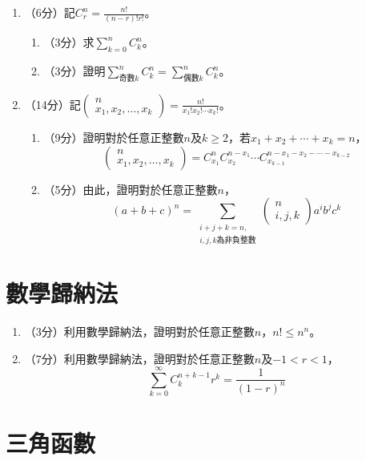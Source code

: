 \documentclass[12pt]{article}
\begin{document}
    \begin{enumerate}
        \item （6分）記$C_r^n=\frac{n!}{(n-r)!r!}$。\begin{enumerate}
            \item （3分）求$\sum_{k=0}^n C_k^n$。
            \item （3分）證明$\sum_{\textrm{奇數}k}^n C_k^n=\sum_{\textrm{偶數}k}^n C_k^n$。
        \end{enumerate}
        \item （14分）記$\begin{pmatrix}
            n\\x_1,x_2,\dots,x_k
        \end{pmatrix}=\frac{n!}{x_1!x_2!\cdots x_k!}$。\begin{enumerate}
            \item （9分）證明對於任意正整數$n$及$k\geq 2$，若$x_1+x_2+\cdots+x_k=n$，$$\begin{pmatrix}
                n\\x_1,x_2,\dots,x_k
            \end{pmatrix}=C_{x_1}^n C_{x_2}^{n-x_1}\cdots C_{x_{k-1}}^{n-x_1-x_2-\cdots-x_{k-2}}$$
            \item （5分）由此，證明對於任意正整數$n$，$$(a+b+c)^n=\sum_{\substack{i+j+k=n, \\ i,j,k\textrm{為非負整數}}} \begin{pmatrix}
                n\\i,j,k
            \end{pmatrix}a^ib^jc^k$$
        \end{enumerate}
    \end{enumerate}

    \section*{數學歸納法}

    \begin{enumerate}
        \item （3分）利用數學歸納法，證明對於任意正整數$n$，$n!\leq n^n$。
        \item （7分）利用數學歸納法，證明對於任意正整數$n$及$-1<r<1$，$$\sum_{k=0}^\infty C_k^{n+k-1}r^k=\frac{1}{(1-r)^n}$$
    \end{enumerate}

    \section*{三角函數}
\end{document}
